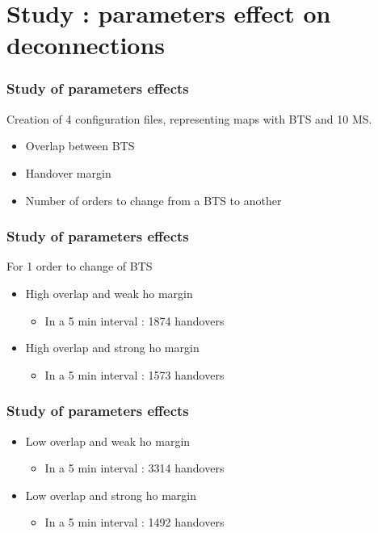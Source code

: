 \documentclass{beamer}
\begin{document}
\section{Study : parameters effect on deconnections}

\begin{frame}
\frametitle{Study of parameters effects}
Creation of 4 configuration files, representing maps with BTS and 10 MS.
\begin{itemize}
 \item Overlap between BTS
 \item Handover margin
 \item Number of orders to change from a BTS to another
\end{itemize}
\end{frame}
\begin{frame}
\frametitle{Study of parameters effects}
For 1 order to change of BTS
\begin{itemize}
 \item High overlap and weak ho margin
  \begin{itemize}
    \item In a 5 min interval : 1874 handovers
  \end{itemize}
 \item High overlap and strong ho margin
  \begin{itemize}
    \item In a 5 min interval : 1573 handovers
  \end{itemize}
\end{itemize}
\end{frame}
\begin{frame}
\frametitle{Study of parameters effects}
\begin{itemize}
 \item Low overlap and weak ho margin
  \begin{itemize}
    \item In a 5 min interval : 3314 handovers
  \end{itemize}
 \item Low overlap and strong ho margin
  \begin{itemize}
    \item In a 5 min interval : 1492 handovers
  \end{itemize}
\end{itemize}
\end{frame}
\end{document}
